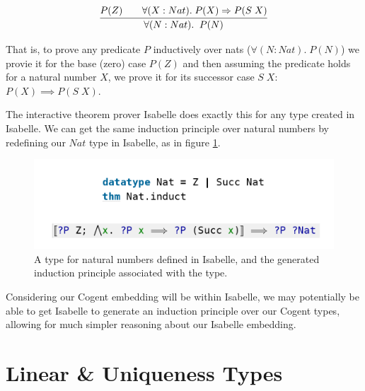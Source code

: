 \[
    \infer{
        \forall(N : Nat).\;\; P(N)
    }{
        P(Z) \quad & \forall (X : Nat).\; P(X) \implies P(S\; X)
    }
\]

That is, to prove any predicate $P$ inductively over nats ($\forall(N : Nat).\; P(N)$)
we provie it for the base (zero) case $P(Z)$ and then assuming the predicate holds
for a natural number $X$, we prove it for its successor case $S\; X$: $P(X) \implies P(S\; X)$.

The interactive theorem prover Isabelle does exactly this for any type created in Isabelle. We can 
get the same induction principle over natural numbers by redefining our $Nat$ type in Isabelle, as in 
figure \ref{fig:IsabelleNatInduct}.

\begin{center}
    \begin{figure}
        \includegraphics[width=\linewidth]{content/isabelleNatInduct.png}
        \caption{A type for natural numbers defined in Isabelle, and the generated 
        induction principle associated with the type.}
        \label{fig:IsabelleNatInduct}
    \end{figure}
\end{center}

\FloatBarrier

Considering our Cogent embedding will be within Isabelle, we may potentially be able to 
get Isabelle to generate an induction principle over our Cogent types, allowing for much 
simpler reasoning about our Isabelle embedding.

\section{Linear \& Uniqueness Types}
